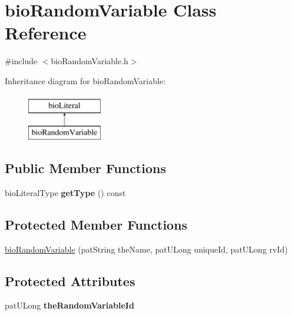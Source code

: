 \hypertarget{classbio_random_variable}{}\section{bio\+Random\+Variable Class Reference}
\label{classbio_random_variable}


{\ttfamily \#include $<$bio\+Random\+Variable.\+h$>$}

Inheritance diagram for bio\+Random\+Variable\+:\begin{figure}[H]
\begin{center}
\leavevmode
\includegraphics[height=2.000000cm]{classbio_random_variable}
\end{center}
\end{figure}
\subsection*{Public Member Functions}
\begin{DoxyCompactItemize}
\item 
\mbox{\label{classbio_random_variable_ae9defc717edfe038c97b497dd9f6b7c7}} 
bio\+Literal\+Type {\bfseries get\+Type} () const
\end{DoxyCompactItemize}
\subsection*{Protected Member Functions}
\begin{DoxyCompactItemize}
\item 
\hyperlink{classbio_random_variable_a6d089f04d982e451e9c58c4a64276156}{bio\+Random\+Variable} (pat\+String the\+Name, pat\+U\+Long unique\+Id, pat\+U\+Long rv\+Id)
\end{DoxyCompactItemize}
\subsection*{Protected Attributes}
\begin{DoxyCompactItemize}
\item 
\mbox{\label{classbio_random_variable_a274f9a81f64b3fe8ec4cc4e5a138f30c}} 
pat\+U\+Long {\bfseries the\+Random\+Variable\+Id}
\end{DoxyCompactItemize}
